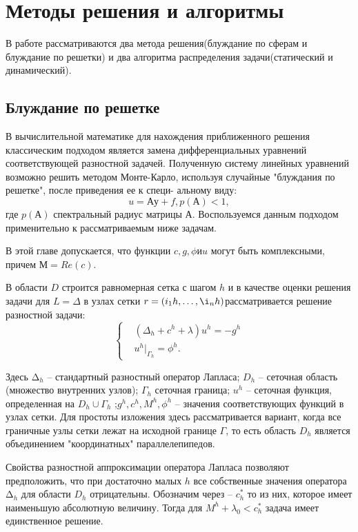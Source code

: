 \chapter{Методы решения и алгоритмы}
В работе рассматриваются два метода решения(блуждание по сферам и блуждание по решетки) и два алгоритма распределения задачи(статический и динамический).
\section{Блуждание по решетке}
В вычислительной математике для нахождения приближенного решения классическим подходом является замена дифференциальных уравнений соответствующей разностной задачей. Полученную систему линейных уравнений возможно решить методом Монте-Карло, используя случайные "блуждания по решетке", после приведения ее к специ-
альному виду:
\begin{equation}
	u = Ау + f, p(А) < 1,
\end{equation}
где $p(А)$  спектральный радиус матрицы А. Воспользуемся данным подходом применительно к рассматриваемым ниже задачам.

В этой главе допускается, что функции $c, g, \phi и u$ могут быть комплексными, причем $М = Re(c)$.

В области $D$ строится равномерная сетка с шагом $h$ и в качестве
оценки решения задачи для $L = \Delta $ в узлах сетки $r=(i_{1}h,\dots,\i_{n}h) $рассматривается решение разностной задачи:
\begin{equation} 
	\left\{
\begin{aligned}
& (\Delta_{h}+c^{h}+\lambda)u^{h}=-g^{h}\\ & u^{h}|_{\Gamma_{h}}=\phi^{h}.
\end{aligned}
 \right. 
 \label{qw1}
 \end{equation}
 
Здесь $∆_{h} $ -- стандартный разностный оператор Лапласа; $D_{h}$ -- сеточная область (множество внутренних узлов); $Γ_{h}$  сеточная граница; $u^{h}$ --  сеточная функция, определенная на $D_{h} \cup \Gamma_{h}$ ;$g^{h},c^{h},M^{h},\phi^{h}$ -- значения соответствующих функций в узлах сетки. Для простоты изложения здесь
рассматривается вариант, когда все граничные узлы сетки лежат на исходной границе $Γ$, то есть область $D_{h}$ является объединением "координатных" параллелепипедов.

Свойства разностной аппроксимации оператора Лапласа позволяют
предположить, что при достаточно малых $h$ все собственные значения
оператора $∆_{h}$ для области $D_{h}$ отрицательны. Обозначим через -- $c^{*}_{h}$ то из них, которое имеет наименьшую абсолютную величину. Тогда для $ M^{h}+\lambda_{0} < c^{*}_{h} $
задача имеет единственное решение.

